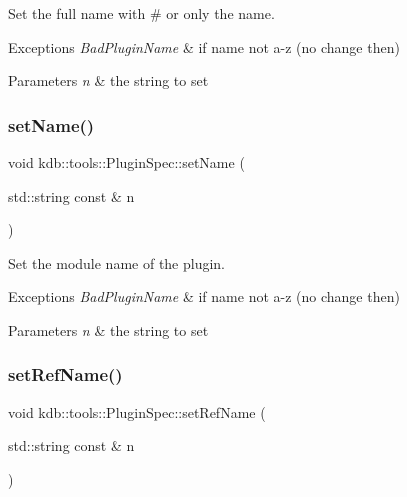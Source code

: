Set the full name with \# or only the name. 


\begin{DoxyExceptions}{Exceptions}
{\em Bad\+Plugin\+Name} & if name not a-\/z (no change then)\\
\hline
\end{DoxyExceptions}

\begin{DoxyParams}{Parameters}
{\em n} & the string to set \\
\hline
\end{DoxyParams}
\mbox{\label{classkdb_1_1tools_1_1PluginSpec_a9b3ade491bab63a6472f9885d2fee1e9}} 
\subsubsection{\texorpdfstring{setName()}{setName()}}
{\footnotesize\ttfamily void kdb\+::tools\+::\+Plugin\+Spec\+::set\+Name (\begin{DoxyParamCaption}\item[{std\+::string const \&}]{n }\end{DoxyParamCaption})}



Set the module name of the plugin. 


\begin{DoxyExceptions}{Exceptions}
{\em Bad\+Plugin\+Name} & if name not a-\/z (no change then)\\
\hline
\end{DoxyExceptions}

\begin{DoxyParams}{Parameters}
{\em n} & the string to set \\
\hline
\end{DoxyParams}
\mbox{\label{classkdb_1_1tools_1_1PluginSpec_a52b63e5cc6f15be122b6fdb83b3079ed}} 
\subsubsection{\texorpdfstring{setRefName()}{setRefName()}}
{\footnotesize\ttfamily void kdb\+::tools\+::\+Plugin\+Spec\+::set\+Ref\+Name (\begin{DoxyParamCaption}\item[{std\+::string const \&}]{n }\end{DoxyParamCaption})}



